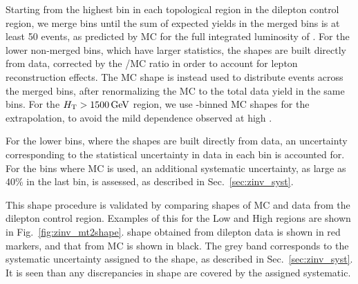 Starting from the highest \mttwo bin in each topological region in the dilepton control region,
we merge bins until the sum of expected yields in the merged bins is at least 50 events, 
as predicted by MC for the full integrated luminosity of \Lint.
For the lower non-merged \mttwo bins, which have larger statistics, the \mttwo shapes are built
directly from \zll data, corrected by the \znunu/\zll MC ratio in order to account
for lepton reconstruction effects. The \znunu MC \mttwo shape is instead used to distribute
events across the merged \mttwo bins, after renormalizing the MC to the total data yield in
the same bins. For the $H_{\mathrm{T}}>1500\,\text{Ge\hspace{-.08em}V}$ region, we use \Nj-binned \znunu MC shapes for 
the extrapolation, to avoid the mild \Nj dependence observed at high \mttwo.

For the lower \mttwo bins, where the \mttwo shapes are built directly from \zll data, an
uncertainty corresponding to the statistical uncertainty in data in each \mttwo bin is accounted for.
For the bins where \znunu MC is used, an additional systematic uncertainty, as large as 40\%
in the last \mttwo bin, is assessed, as described in Sec.~\ref{sec:zinv_syst}.

This \mttwo shape procedure is validated by comparing \mttwo shapes of
\znunu MC and \zll data from the dilepton control region. Examples of this
for the Low and High \Ht regions are shown in Fig.~\ref{fig:zinv_mt2shape}.
\mttwo shape obtained from dilepton data is shown in red markers, and that
from \znunu MC is shown in black. The grey band corresponds to the systematic
uncertainty assigned to the \znunu shape, as described in Sec.~\ref{sec:zinv_syst}.
It is seen than any discrepancies in shape are covered by the assigned systematic.


